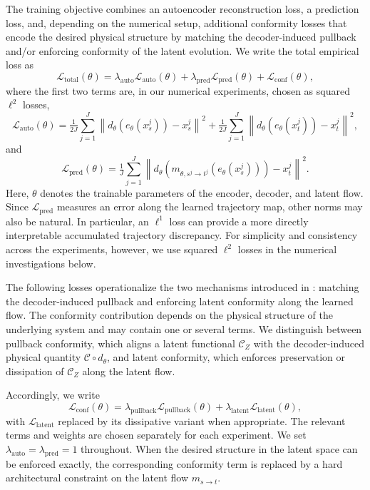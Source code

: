 \documentclass[a4paper,fleqn]{cas-sc}
\theoremstyle{thmstyleone}%
\theoremstyle{thmstyletwo}%
\theoremstyle{thmstylethree}%
\begin{document}
The training objective combines an autoencoder reconstruction loss, a prediction loss, and, depending on the numerical setup, additional conformity losses that encode the desired physical structure by matching the decoder-induced pullback and/or enforcing conformity of the latent evolution. We write the total empirical loss as
\begin{equation}\label{eq:loss}
    \mathcal L_{\mathrm{total}}(\theta)
        = \lambda_{\mathrm{auto}}\mathcal L_{\mathrm{auto}}(\theta)
        + \lambda_{\mathrm{pred}}\mathcal L_{\mathrm{pred}}(\theta)
        + \mathcal L_{\mathrm{conf}}(\theta) ,
\end{equation}
where the first two terms are, in our numerical experiments, chosen as squared $\ell^2$ losses,
\[
    \mathcal L_{\mathrm{auto}}(\theta)
        = \tfrac{1}{2J}\sum_{j=1}^J \left\|     d_\theta(e_\theta(x_s^j))-x_s^j \right\|^2
        + \tfrac{1}{2J}\sum_{j=1}^J     \left\|     d_\theta(e_\theta(x_t^j))-x_t^j  \right\|^2,
\]
and
\[
    \mathcal L_{\mathrm{pred}}(\theta)
        = \tfrac{1}{J}\sum_{j=1}^J \left\|     d_\theta\!\left(m_{\theta,s^j\to t^j}(e_\theta(x_s^j))\right)-x_t^j \right\|^2 .
\]
Here, $\theta$ denotes the trainable parameters of the encoder, decoder, and latent flow. Since $\mathcal L_{\mathrm{pred}}$ measures an error along the learned trajectory map, other norms may also be natural. In particular, an $\ell^1$ loss can provide a more directly interpretable accumulated trajectory discrepancy. For simplicity and consistency across the experiments, however, we use squared $\ell^2$ losses in the numerical investigations below.

The following losses operationalize the two mechanisms introduced in : matching the decoder-induced pullback and enforcing latent conformity along the learned flow. The conformity contribution depends on the physical structure of the underlying system and may contain one or several terms. We distinguish between pullback conformity, which aligns a latent functional $\mathcal C_Z$ with the decoder-induced physical quantity $\mathcal C\circ d_\theta$, and latent conformity, which enforces preservation or dissipation of $\mathcal C_Z$ along the latent flow.

Accordingly, we write
\begin{equation}
    \mathcal L_{\mathrm{conf}}(\theta) =\lambda_{\mathrm{pullback}}\mathcal L_{\mathrm{pullback}}(\theta) + \lambda_{\mathrm{latent}}\mathcal L_{\mathrm{latent}}(\theta),
    \label{eq:conformity-loss}
\end{equation}
with $\mathcal L_{\mathrm{latent}}$ replaced by its dissipative variant when appropriate. The relevant terms and weights are chosen separately for each experiment. We set $\lambda_{\mathrm{auto}}=\lambda_{\mathrm{pred}}=1$ throughout. When the desired structure in the latent space can be enforced exactly, the corresponding conformity term is replaced by a hard architectural constraint on the latent flow $m_{s\to t}$.
\end{document}
